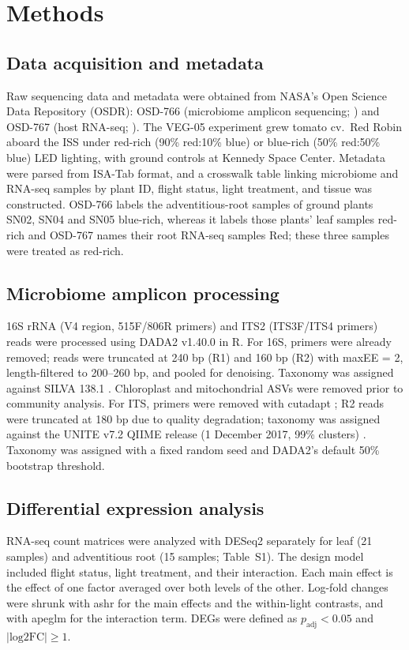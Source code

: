 \documentclass[pdflatex,sn-nature]{sn-jnl}
\begin{document}
\section{Methods}\label{sec:methods}

\subsection{Data acquisition and metadata}
Raw sequencing data and metadata were obtained from NASA's Open Science Data
Repository (OSDR): OSD-766 (microbiome amplicon sequencing; \cite{spern2026}) and OSD-767 (host
RNA-seq; \cite{dixit2026}). The VEG-05 experiment grew tomato cv.\ Red Robin aboard the ISS under red-rich (90\% red:10\% blue)
or blue-rich (50\% red:50\% blue) LED lighting, with ground controls at Kennedy Space Center. Metadata were
parsed from ISA-Tab format, and a crosswalk table linking microbiome and RNA-seq
samples by plant ID, flight status, light treatment, and tissue was constructed. OSD-766 labels
the adventitious-root samples of ground plants SN02, SN04 and SN05 blue-rich, whereas it labels
those plants' leaf samples red-rich and OSD-767 names their root RNA-seq samples Red; these three
samples were treated as red-rich.

\subsection{Microbiome amplicon processing}
16S rRNA (V4 region, 515F/806R primers) and ITS2 (ITS3F/ITS4 primers) reads were
processed using DADA2 v1.40.0 \cite{callahan2016} in R. For 16S, primers were
already removed; reads were truncated at 240 bp (R1) and 160 bp (R2) with maxEE = 2,
length-filtered to 200--260 bp, and pooled for denoising. Taxonomy was assigned
against SILVA 138.1 \cite{quast2013}. Chloroplast and mitochondrial ASVs were
removed prior to community analysis. For ITS, primers were removed with cutadapt
\cite{martin2011}; R2 reads were truncated at 180 bp due to quality degradation;
taxonomy was assigned against the UNITE v7.2 QIIME release (1 December 2017, 99\% clusters)
\cite{koljalg2005}. Taxonomy was assigned with a fixed random seed and DADA2's default 50\%
bootstrap threshold.

\subsection{Differential expression analysis}
RNA-seq count matrices were analyzed with DESeq2 \cite{love2014} separately for leaf
(21 samples) and adventitious root (15 samples; Table~S1). The design model included
flight status, light treatment, and their interaction. Each main effect is the effect
of one factor averaged over both levels of the other. Log-fold changes were shrunk with
ashr \cite{stephens2017} for the main effects and the within-light contrasts, and with
apeglm \cite{zhu2019} for the interaction term. DEGs were defined as \(p_{\mathrm{adj}} < 0.05\) and \(|\text{log2FC}|
\geq 1\).
\end{document}
